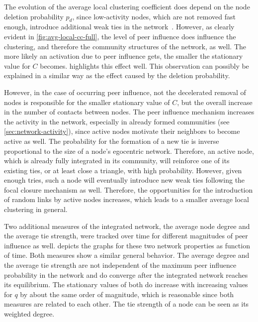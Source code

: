 The evolution of the average local clustering coefficient does depend on the node deletion probability \( p_{d} \), since low-activity nodes, which are not removed fast enough, introduce additional weak ties in the network~\cite{Laurent2015}.
However, as clearly evident in \cref{fig:avg-local-cc-full}, the level of peer influence does influence the clustering, and therefore the community structures of the network, as well.
The more likely an activation due to peer influence gets, the smaller the stationary value for \( C \) becomes.
 highlights this effect well.
This observation can possibly be explained in a similar way as the effect caused by the deletion probability.

However, in the case of occurring peer influence, not the decelerated removal of nodes is responsible for the smaller stationary value of \( C \), but the overall increase in the number of contacts between nodes.
The peer influence mechanism increases the activity in the network, especially in already formed communities (see \cref{sec:network-activity}), since active nodes motivate their neighbors to become active as well.
The probability for the formation of a new tie is inverse proportional to the size of a node's egocentric network.
Therefore, an active node, which is already fully integrated in its community, will reinforce one of its existing ties, or at least close a triangle, with high probability.
However, given enough tries, such a node will eventually introduce new weak ties following the focal closure mechanism as well.
Therefore, the opportunities for the introduction of random links by active nodes increases, which leads to a smaller average local clustering in general.

Two additional measures of the integrated network, the average node degree and the average tie strength, were tracked over time for different magnitudes of peer influence as well.
 depicts the graphs for these two network properties as function of time.
Both measures show a similar general behavior.
The average degree and the average tie strength are not independent of the maximum peer influence probability in the network and do converge after the integrated network reaches its equilibrium.
The stationary values of both do increase with increasing values for \( q \) by about the same order of magnitude, which is reasonable since both measures are related to each other.
The tie strength of a node can be seen as its weighted degree.


